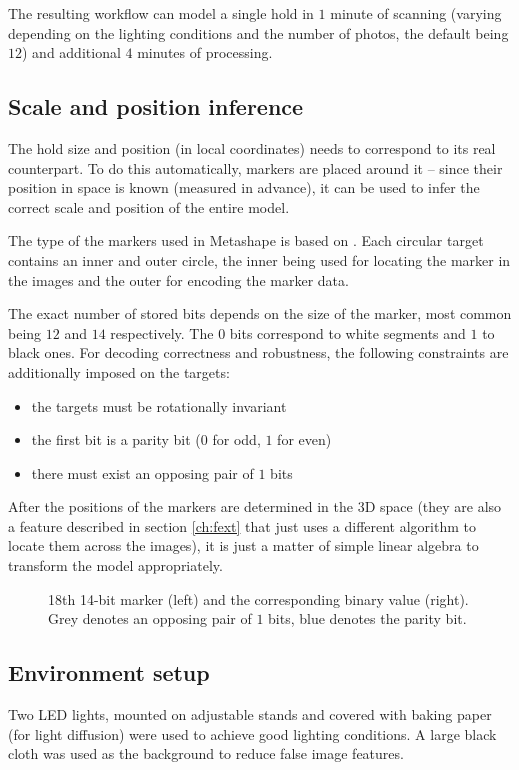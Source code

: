 The resulting workflow can model a single hold in $1$ minute of scanning (varying depending on the lighting conditions and the number of photos, the default being $12$) and additional $4$ minutes of processing.

\subsection{Scale and position inference}\label{sec:markersss}
The hold size and position (in local coordinates) needs to correspond to its real counterpart.
To do this automatically, markers are placed around it -- since their position in space is known (measured in advance), it can be used to infer the correct scale and position of the entire model.

The type of the markers used in Metashape is based on \citet{schneider19913,borisPatent}.
Each circular target contains an inner and outer circle, the inner being used for locating the marker in the images and the outer for encoding the marker data.

The exact number of stored bits depends on the size of the marker, most common being $12$ and $14$ respectively.
The $0$ bits correspond to white segments and $1$ to black ones.
For decoding correctness and robustness, the following constraints are additionally imposed on the targets:

\begin{itemize}
	\item the targets must be rotationally invariant
	\item the first bit is a parity bit ($0$ for odd, $1$ for even)
	\item there must exist an opposing pair of $1$ bits
\end{itemize}

After the positions of the markers are determined in the 3D space (they are also a feature described in section \ref{ch:fext} that just uses a different algorithm to locate them across the images), it is just a matter of simple linear algebra to transform the model appropriately.

\begin{figure}[t]
	\centering
	
	\caption{18th 14-bit marker (left) and the corresponding binary value (right). Grey denotes an opposing pair of $1$ bits, blue denotes the parity bit.}
\end{figure}

\subsection{Environment setup}
Two LED lights, mounted on adjustable stands and covered with baking paper (for light diffusion) were used to achieve good lighting conditions.
A large black cloth was used as the background to reduce false image features.

